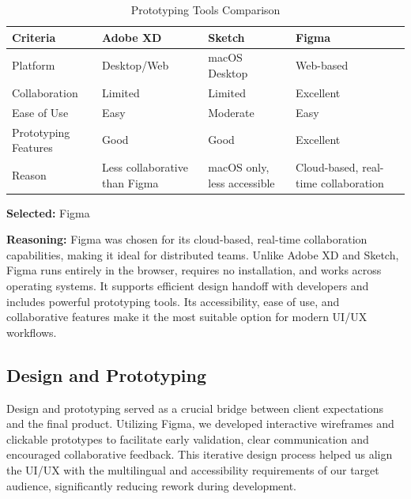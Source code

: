 \begin{table}[H]
\centering
\caption{Prototyping Tools Comparison}
\begin{tabular}{|l|p{4cm}|p{4cm}|p{4cm}|}
\hline
\textbf{Criteria}       & \textbf{Adobe XD}          & \textbf{Sketch}             & \textbf{Figma}               \\
\hline
Platform                & Desktop/Web                & macOS Desktop               & Web-based                   \\
Collaboration           & Limited                   & Limited                    & Excellent                   \\
Ease of Use             & Easy                      & Moderate                   & Easy                        \\
Prototyping Features    & Good                      & Good                       & Excellent                   \\
Reason                  & Less collaborative than Figma & macOS only, less accessible & Cloud-based, real-time collaboration \\
\hline
\end{tabular}
\label{tab:prototyping-tools-comparison}
\end{table}

\textbf{Selected:} Figma \par
\textbf{Reasoning:} Figma was chosen for its cloud-based, real-time collaboration capabilities, making it ideal for distributed teams. Unlike Adobe XD and Sketch, Figma runs entirely in the browser, requires no installation, and works across operating systems. It supports efficient design handoff with developers and includes powerful prototyping tools. Its accessibility, ease of use, and collaborative features make it the most suitable option for modern UI/UX workflows.

\vspace{2em}

\subsection{Design and Prototyping}

Design and prototyping served as a crucial bridge between client expectations and the final product. Utilizing Figma, we developed interactive wireframes and clickable prototypes to facilitate early validation, clear communication and encouraged collaborative feedback. This iterative design process helped us align the UI/UX with the multilingual and accessibility requirements of our target audience, significantly reducing rework during development.

